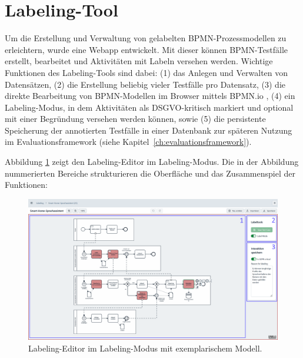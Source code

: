 \section{Labeling-Tool}\label{sec:labeling-tool}

Um die Erstellung und Verwaltung von gelabelten \ac{BPMN}-Prozessmodellen zu erleichtern, wurde eine Webapp entwickelt. Mit dieser können \ac{BPMN}-Testfälle erstellt, bearbeitet und Aktivitäten mit Labeln versehen werden. Wichtige Funktionen des Labeling-Tools sind dabei: (1) das Anlegen und Verwalten von Datensätzen, (2) die Erstellung beliebig vieler Testfälle pro Datensatz, (3) die direkte Bearbeitung von \ac{BPMN}-Modellen im Browser mittels BPMN.io \cite{bpmnio}, (4) ein Labeling-Modus, in dem Aktivitäten als \ac{DSGVO}-kritisch markiert und optional mit einer Begründung versehen werden können, sowie (5) die persistente Speicherung der annotierten Testfälle in einer Datenbank zur späteren Nutzung im Evaluationsframework (siehe Kapitel~\ref{ch:evaluationsframework}).

Abbildung \ref{fig:labeling-editor} zeigt den Labeling-Editor im Labeling-Modus. Die in der Abbildung nummerierten Bereiche strukturieren die Oberfläche und das Zusammenspiel der Funktionen:

\begin{figure}[h]
    \centering
    \includegraphics[width=\textwidth]{images/labeling/labeling-editor-annotated}
    \caption{Labeling-Editor im Labeling-Modus mit exemplarischem Modell.}
    \label{fig:labeling-editor}
\end{figure}

